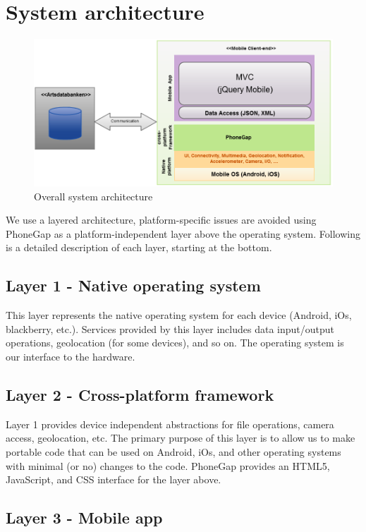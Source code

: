 \section{System architecture}
\begin{figure}[htb]
	\centering
	\includegraphics[width=1.0\textwidth]{architecture/architecture3.png}
	\caption{Overall system architecture}
	\label{fig:architecture}
\end{figure}

We use a layered architecture, platform-specific issues are avoided using
PhoneGap as a platform-independent layer above the operating system. Following
is a detailed description of each layer, starting at the bottom.

\subsection{Layer 1 - Native operating system}

This layer represents the native operating system for each device (Android, iOs,
blackberry, etc.). Services provided by this layer includes data input/output
operations, geolocation (for some devices), and so on. The operating system is
our interface to the hardware.

\subsection{Layer 2 - Cross-platform framework}

Layer 1 provides device independent abstractions for file operations, camera
access, geolocation, etc. The primary purpose of this layer is to allow us to
make portable code that can be used on Android, iOs, and other operating systems
with minimal (or no) changes to the code. PhoneGap provides an HTML5,
JavaScript, and CSS interface for the layer above.

\subsection{Layer 3 - Mobile app}

